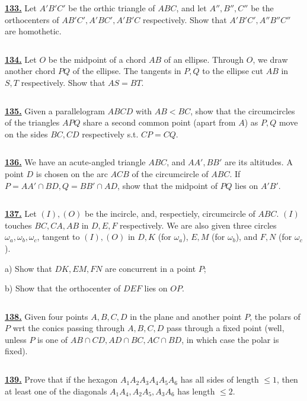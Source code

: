 \documentclass{article}
\begin{document}
\href{http://www.artofproblemsolving.com/Forum/viewtopic.php?p=204466#p204466
 }{\bf 133.} Let $A'B'C'$ be the orthic triangle of $ABC$, and let $A'',B'',C''$ be the orthocenters of $AB'C',A'BC',A'B'C$ respectively. Show that $A'B'C',A''B''C''$ are homothetic.


$$ $$

\href{ http://www.artofproblemsolving.com/Forum/viewtopic.php?p=215657#p215657
}{\bf 134.} Let $O$ be the midpoint of a chord $AB$ of an ellipse. Through $O$, we draw another chord $PQ$ of the ellipse. The tangents in $P,Q$ to the ellipse cut $AB$ in $S,T$ respectively. Show that $AS=BT$.


$$ $$


\href{http://www.artofproblemsolving.com/Forum/viewtopic.php?p=220177#p220177
 }{\bf 135.} Given a parallelogram $ABCD$ with $AB<BC$, show that the circumcircles of the triangles $APQ$ share a second common point (apart from $A$) as $P,Q$ move on the sides $BC,CD$ respectively s.t. $CP=CQ$.


$$ $$


\href{ http://www.artofproblemsolving.com/Forum/viewtopic.php?p=220179#p220179
}{\bf 136.} We have an acute-angled triangle $ABC$, and $AA',BB'$ are its altitudes. A point $D$ is chosen on the arc $ACB$ of the circumcircle of $ABC$. If $P=AA'\cap BD,Q=BB'\cap AD$, show that the midpoint of $PQ$ lies on $A'B'$.


$$ $$


\href{http://www.artofproblemsolving.com/Forum/viewtopic.php?p=229579#p229579
 }{\bf 137.} Let $(I),(O)$ be the incircle, and, respectiely, circumcircle of $ABC$. $(I)$ touches $BC,CA,AB$ in $D,E,F$ respectively. We are also given three circles $\omega_a,\omega_b,\omega_c$, tangent to $(I),(O)$ in $D,K$ (for $\omega_a$), $E,M$ (for $\omega_b$), and $F,N$ (for $\omega_c$).

a) Show that $DK,EM,FN$ are concurrent in a point $P$;

b) Show that the orthocenter of $DEF$ lies on $OP$.


$$ $$


\href{http://www.artofproblemsolving.com/Forum/viewtopic.php?p=260264#p260264
 }{\bf 138.} Given four points $A,B,C,D$ in the plane and another point $P$, the polars of $P$ wrt the conics passing through $A,B,C,D$ pass through a fixed point (well, unless $P$ is one of $AB\cap CD,AD\cap BC,AC\cap BD$, in which case the polar is fixed).


$$ $$


\href{ http://www.artofproblemsolving.com/Forum/viewtopic.php?p=319718#p319718
}{\bf 139.} Prove that if the hexagon $A_1A_2A_3A_4A_5A_6$ has all sides of length $\le 1$, then at least one of the diagonals $A_1A_4,A_2A_5,A_3A_6$ has length $\le 2$.
\end{document}
